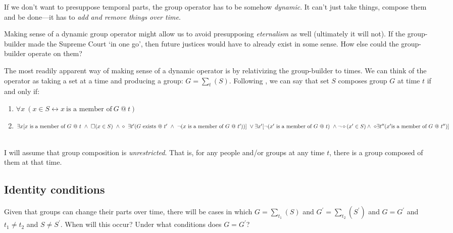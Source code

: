 \documentclass[11pt]{article}
\begin{document}
\begin{spacing}{1.5}
If we don't want to presuppose temporal parts, the group operator has
to be somehow \emph{dynamic}. It can't just take things, compose them
and be done---it has to \emph{add and remove things over time}.

Making sense of a dynamic group operator might allow us to avoid
presupposing {\em eternalism} as well (ultimately it will not).  If
the group-builder made the Supreme Court `in one go', then future
justices would have to already exist in some sense.  How else could
the group-builder operate on them?

The most readily apparent way of making sense of a dynamic operator is
by relativizing the group-builder to times.  We can think of the
operator as taking a set at a time and producing a group: $G = \sum
_{t} (S)$.  Following \citet{uzquiano2004a}, we can say that set $S$
composes group $G$ at time $t$ if and only if:

\begin{enumerate}[label=(\arabic*)]
  \item $\forall x\ (x \in S \leftrightarrow x\ \text{is a member of}\ G
  \  @\ t)$
  \item $\exists x {[} x\ \text{is a member
      of}\ G\ @\ t\ \wedge\ \square ( x \in S )\ \wedge
    \\ \diamond\ \exists t^{\prime} ( G\ \text{exists}\ @
    \ t^{\prime}\ \wedge\ \neg ( x\ \text{is a member
      of}\ G\ @\ t^{\prime} )) {]}\ \vee \\ \exists x^{\prime} {[}
    \neg ( x^{\prime}\ \text{is a member of}\ G\ @\ t)\ \wedge \\ \neg
    \diamond (x^{\prime} \in S ) \wedge \ \diamond \exists t^{\prime
      \prime} (x^{\prime} \text{is a member of}\ G\ @\ t^{\prime
      \prime}) {]}$\ \citeyearpar[150]{uzquiano2004a}
\end{enumerate}

I will assume that group composition is {\em unrestricted}.  That is,
for any people and/or groups at any time $t$, there is a group
composed of them at that time.

\subsection{Identity conditions}
\label{group-id}
Given that groups can change their parts over time, there will be
cases in which $G = \sum _{t_1} ( S )$ and $G^{\prime} = \sum _{t_2}
( S^{\prime} )$ and $G = G^{\prime}$ and $t_1 \neq t_2$ and $S \neq
S^{\prime}$.  When will this occur?  Under what conditions does $G =
G^{\prime}$?


\end{spacing}
\end{document}
